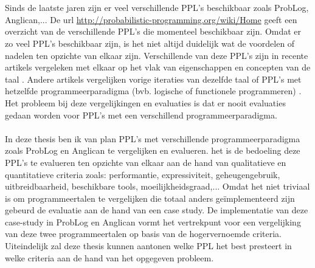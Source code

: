 \documentclass[12pt,a4paper,oneside]{book}
\theoremstyle{definition}
\begin{document}
\\\\
Sinds de laatste jaren zijn er veel verschillende PPL's beschikbaar zoals ProbLog, Anglican,... De url \url{http://probabilistic-programming.org/wiki/Home} geeft een overzicht van de verschillende PPL's die momenteel beschikbaar zijn.
Omdat er zo veel PPL’s beschikbaar zijn, is het niet altijd duidelijk wat de voordelen of nadelen ten opzichte van elkaar zijn. Verschillende van deze PPL’s zijn in recente artikels vergeleken met elkaar op het vlak van eigenschappen en concepten van de taal \cite{plpconcepts}. Andere artikels vergelijken vorige iteraties van dezelfde taal of PPL’s met hetzelfde programmeerparadigma (bvb. logische of functionele programmeren) \cite{plpinferencelearningwbf}. Het probleem bij deze vergelijkingen en evaluaties is dat er nooit evaluaties gedaan worden voor PPL's met een verschillend programmeerparadigma.
\\\\
In deze thesis ben ik van plan PPL’s met verschillende programmeerparadigma zoals ProbLog en Anglican te vergelijken en evalueren. het is de bedoeling deze PPL’s te evalueren ten opzichte van elkaar aan de hand van qualitatieve en quantitatieve criteria zoals: performantie, expressiviteit, geheugengebruik, uitbreidbaarheid, beschikbare tools, moeilijkheidsgraad,... Omdat het niet triviaal is om programmeertalen te vergelijken die totaal anders geïmplementeerd zijn gebeurd de evaluatie aan de hand van een case study. De implementatie van deze case-study in ProbLog en Anglican vormt het vertrekpunt voor een vergelijking van deze twee programmeertalen op basis van de hogervernoemde criteria. Uiteindelijk zal deze thesis kunnen aantonen welke PPL het best presteert in welke criteria aan de hand van het opgegeven probleem.
\end{document}
